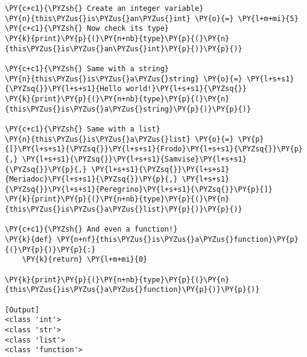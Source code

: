 \begin{Verbatim}[label=\makebox{\url{https://bitbucket.org/lbaldini/programming/src/tip/snippets/everything\_is\_a\_class.py}},commandchars=\\\{\}]
\PY{c+c1}{\PYZsh{} Create an integer variable}
\PY{n}{this\PYZus{}is\PYZus{}an\PYZus{}int} \PY{o}{=} \PY{l+m+mi}{5}
\PY{c+c1}{\PYZsh{} Now check its type}
\PY{k}{print}\PY{p}{(}\PY{n+nb}{type}\PY{p}{(}\PY{n}{this\PYZus{}is\PYZus{}an\PYZus{}int}\PY{p}{)}\PY{p}{)}

\PY{c+c1}{\PYZsh{} Same with a string}
\PY{n}{this\PYZus{}is\PYZus{}a\PYZus{}string} \PY{o}{=} \PY{l+s+s1}{\PYZsq{}}\PY{l+s+s1}{Hello world!}\PY{l+s+s1}{\PYZsq{}} 
\PY{k}{print}\PY{p}{(}\PY{n+nb}{type}\PY{p}{(}\PY{n}{this\PYZus{}is\PYZus{}a\PYZus{}string}\PY{p}{)}\PY{p}{)}

\PY{c+c1}{\PYZsh{} Same with a list}
\PY{n}{this\PYZus{}is\PYZus{}a\PYZus{}list} \PY{o}{=} \PY{p}{[}\PY{l+s+s1}{\PYZsq{}}\PY{l+s+s1}{Frodo}\PY{l+s+s1}{\PYZsq{}}\PY{p}{,} \PY{l+s+s1}{\PYZsq{}}\PY{l+s+s1}{Samvise}\PY{l+s+s1}{\PYZsq{}}\PY{p}{,} \PY{l+s+s1}{\PYZsq{}}\PY{l+s+s1}{Meriadoc}\PY{l+s+s1}{\PYZsq{}}\PY{p}{,} \PY{l+s+s1}{\PYZsq{}}\PY{l+s+s1}{Peregrino}\PY{l+s+s1}{\PYZsq{}}\PY{p}{]}
\PY{k}{print}\PY{p}{(}\PY{n+nb}{type}\PY{p}{(}\PY{n}{this\PYZus{}is\PYZus{}a\PYZus{}list}\PY{p}{)}\PY{p}{)}

\PY{c+c1}{\PYZsh{} And even a function!}
\PY{k}{def} \PY{n+nf}{this\PYZus{}is\PYZus{}a\PYZus{}function}\PY{p}{(}\PY{p}{)}\PY{p}{:}
    \PY{k}{return} \PY{l+m+mi}{0}
    
\PY{k}{print}\PY{p}{(}\PY{n+nb}{type}\PY{p}{(}\PY{n}{this\PYZus{}is\PYZus{}a\PYZus{}function}\PY{p}{)}\PY{p}{)}

[Output]
<class 'int'>
<class 'str'>
<class 'list'>
<class 'function'>
\end{Verbatim}